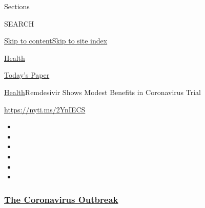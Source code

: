 Sections

SEARCH

\protect\hyperlink{site-content}{Skip to
content}\protect\hyperlink{site-index}{Skip to site index}

\href{https://www.nytimes3xbfgragh.onion/section/health}{Health}

\href{https://myaccount.nytimes3xbfgragh.onion/auth/login?response_type=cookie\&client_id=vi}{}

\href{https://www.nytimes3xbfgragh.onion/section/todayspaper}{Today's
Paper}

\href{/section/health}{Health}\textbar{}Remdesivir Shows Modest Benefits
in Coronavirus Trial

\url{https://nyti.ms/2YnIECS}

\begin{itemize}
\item
\item
\item
\item
\item
\item
\end{itemize}

\hypertarget{the-coronavirus-outbreak}{%
\subsubsection{\texorpdfstring{\href{https://www.nytimes3xbfgragh.onion/news-event/coronavirus?name=styln-coronavirus-national\&region=TOP_BANNER\&block=storyline_menu_recirc\&action=click\&pgtype=Article\&impression_id=836c2d70-f2a2-11ea-913e-653d2f4141c6\&variant=undefined}{The
Coronavirus
Outbreak}}{The Coronavirus Outbreak}}\label{the-coronavirus-outbreak}}

